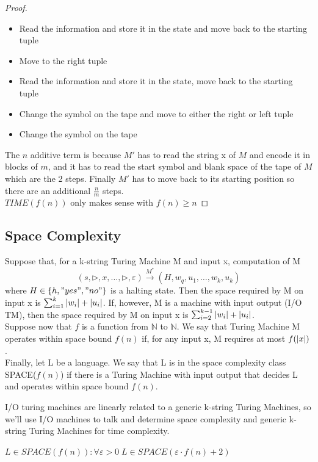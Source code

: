 \begin{theorem}
\begin{proof}
\begin{itemize}
            \item Read the information and store it in the state and move back to the starting tuple
            \item Move to the right tuple 
            \item Read the information and store it in the state, move back to the starting tuple
            \item Change the symbol on the tape and move to either the right or left tuple
            \item Change the symbol on the tape 
        \end{itemize}
        The $n$ additive term is because $M'$ has to read the string x of $M$ and encode it in blocks of $m$, and it has to read the start symbol and blank space of the tape of $M$ which are the 2 steps. Finally $M'$ has to move back to its starting position so there are an additional $\frac{n}{m}$ steps.\\
        $TIME(f(n))$ only makes sense with $f(n) \geq n$
    \end{proof}
\end{theorem}

\subsection{Space Complexity}
\begin{definition}
    Suppose that, for a k-string Turing Machine M and input x, computation of M
    \[ 
        (s,\triangleright, x, \ldots, \triangleright, \varepsilon) \overset{M^*}{\longrightarrow} (H, w_q, u_1, \ldots, w_k,u_k) 
    \] where $H \in \left\{ h, "yes", "no" \right\}$ is a halting state. Then the space required by M on input x is $\sum_{i=1}^{k}{\left\lvert w_i\right\rvert+\left\lvert u_i\right\rvert}$. If, however, M is a machine with input output (I/O TM), then the space required by M on input x is $\sum_{i=2}^{k-1}{\left\lvert w_i\right\rvert+\left\lvert u_i\right\rvert}$.\\
    Suppose now that $f$ is a function from $\mathbb{N}$ to $\mathbb{N}$. We say that Turing Machine M operates within space bound $f(n)$ if, for any input x, M requires at most $f(\left\lvert x\right\rvert) $.\\
    Finally, let L be a language. We say that L is in the space complexity class SPACE($f(n)$) if there is a Turing Machine with input output that decides L and operates within space bound $f(n)$. 
\end{definition}
I/O turing machines are linearly related to a generic k-string Turing Machines, so we'll use I/O machines to talk and determine space complexity and generic k-string Turing Machines for time complexity.
\begin{theorem}
    $L \in SPACE(f(n)) : \forall \varepsilon >0 \; L \in SPACE(\varepsilon\cdot f(n) +2)$
\end{theorem}


